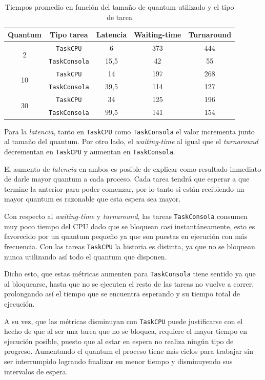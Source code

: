 \begin{table}[H]
	\begin{center}
		\begin{tabular}{|c|c|c|c|c|}
			\hline
			\textbf{Quantum} & \textbf{Tipo tarea} & \textbf{Latencia} & \textbf{Waiting-time} & \textbf{Turnaround} \\ \hline
			\multirow{2}{*}{2} & \texttt{TaskCPU} & 6 & 373 & 444 \\ \cline{2-5}
			& \texttt{TaskConsola} & 15,5 & 42 & 55 \\ \hline \hline
			\multirow{2}{*}{10} & \texttt{TaskCPU} & 14 & 197 & 268 \\ \cline{2-5}
			& \texttt{TaskConsola} & 39,5 & 114 & 127 \\ \hline \hline
			\multirow{2}{*}{30} & \texttt{TaskCPU} & 34 & 125 & 196 \\ \cline{2-5}
			& \texttt{TaskConsola} & 99,5 & 141 & 154 \\ \hline
		\end{tabular}
		\caption{Tiempos promedio en función del tamaño de quantum utilizado y
		el tipo de tarea}
	\end{center}
\end{table}

Para la \emph{latencia}, tanto en \texttt{TaskCPU} como \texttt{TaskConsola} el
valor incrementa junto al tamaño del quantum. Por otro lado, el
\emph{waiting-time} al igual que el \emph{turnaround} decrementan en
\texttt{TaskCPU} y aumentan en \texttt{TaskConsola}.

El aumento de \emph{latencia} en ambos es posible de explicar como resultado
inmediato de darle mayor quantum a cada proceso. Cada tarea tendrá que esperar
a que termine la anterior para poder comenzar, por lo tanto si están
recibiendo un mayor quantum es razonable que esta espera sea mayor.

Con respecto al \emph{waiting-time} y \emph{turnaround}, las tareas
\texttt{TaskConsola} consumen muy poco tiempo del CPU dado que se bloquean casi
instantáneamente, esto es favorecido por un quantum pequeño ya que son puestas
en ejecución con más frecuencia. Con las tareas \texttt{TaskCPU} la historia es
distinta, ya que no se bloquean nunca utilizando así todo el quantum que
disponen.

Dicho esto, que estas métricas aumenten para \texttt{TaskConsola}
tiene sentido ya que al bloquearse, hasta que no se ejecuten el resto de las tareas no
vuelve a correr, prolongando así el tiempo que se encuentra esperando y su tiempo
total de ejecución.

A su vez, que las métricas disminuyan con \texttt{TaskCPU} puede justificarse
con el hecho de que al ser una tarea que no se bloquea, requiere el mayor tiempo
en ejecución posible, puesto que al estar en espera no realiza ningún tipo de
progreso. Aumentando el quantum el proceso tiene más ciclos para trabajar sin
ser interrumpido logrando finalizar en menor tiempo y disminuyendo sus
intervalos de espera.
